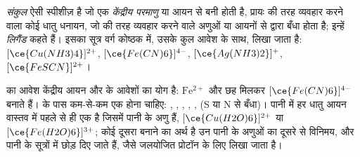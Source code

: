 \begin{definition}[संकुल, केंद्रीय परमाणु, लिगैंड]\label{def:b1:complexation:complex}
\emph{संकुल} ऐसी स्पीशीज़ है जो एक \emph{केंद्रीय
परमाणु} या आयन से बनी होती है, प्रायः  की तरह
व्यवहार करने वाला कोई धातु धनायन, जो  की तरह व्यवहार करने वाले अणुओं या आयनों से
 द्वारा बँधा होता है; इन्हें \emph{लिगैंड} कहते हैं। इसका सूत्र
वर्ग कोष्ठक में, उसके कुल आवेश के साथ, लिखा जाता है: $[\ce{Cu(NH3)4}]^{2+}$,
$[\ce{Fe(CN)6}]^{4-}$, $[\ce{Ag(NH3)2}]^{+}$, $[\ce{FeSCN}]^{2+}$।
\end{definition}

 का आवेश केंद्रीय आयन और  के आवेशों का योग
है: $\mathrm{Fe^{2+}}$ और छह  मिलकर
$[\ce{Fe(CN)6}]^{4-}$ बनाते हैं।  के पास कम-से-कम एक  होना चाहिए: ,
, , , ,  (S या N से बँधा)।
पानी में हर धातु आयन वास्तव में पहले से ही एक  है जिसमें पानी के
अणु  हैं, $[\ce{Cu(H2O)6}]^{2+}$ या $[\ce{Fe(H2O)6}]^{3+}$;
कोई दूसरा  बनाने का अर्थ है उन पानी के अणुओं का दूसरे
 से विनिमय, और पानी के  सूत्रों में छोड़ दिए जाते हैं, जैसे जलयोजित प्रोटॉन
के लिए  लिखा जाता है।

